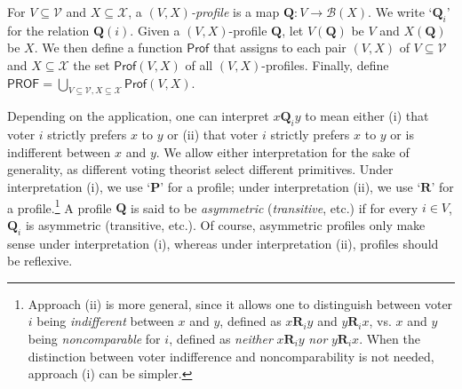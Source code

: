 \documentclass[runningheads]{llncs}
\begin{document}
\begin{definition}\label{ProfileDef} \textnormal{For $V\subseteq\mathcal{V}$ and $X\subseteq\mathcal{X}$, a \emph{$(V,X)$-profile} is a map $\mathbf{Q}:V\to \mathcal{B}(X)$. We write `$\mathbf{Q}_i$' for the relation $\mathbf{Q}(i)$. Given a $(V,X)$-profile $\mathbf{Q}$, let $V(\mathbf{Q})$ be $V$ and $X(\mathbf{Q})$  be $X$. We then define a function $\mathsf{Prof}$ that assigns to each pair $(V,X)$ of $V\subseteq\mathcal{V}$ and $X\subseteq\mathcal{X}$ the set $\mathsf{Prof}(V,X)$ of all $(V,X)$-profiles. Finally, define $\mathsf{PROF} = \bigcup_{V\subseteq\mathcal{V},X\subseteq\mathcal{X}}\mathsf{Prof}(V,X)$.}\end{definition}

Depending on the application, one can interpret $x\mathbf{Q}_i y$ to mean either (i) that voter $i$ strictly prefers $x$ to $y$ or (ii) that voter $i$ strictly prefers $x$ to $y$ or is indifferent between $x$ and $y$. We allow either interpretation for the sake of generality, as different voting theorist select different primitives. Under interpretation (i), we use `$\mathbf{P}$' for a profile; under interpretation (ii), we use `$\mathbf{R}$' for a profile.\footnote{\label{VoterNote}Approach (ii) is more general, since it allows one to distinguish between voter $i$ being \textit{indifferent} between $x$ and $y$, defined as $x\mathbf{R}_iy$ and $y\mathbf{R}_ix$, vs. $x$ and $y$ being \textit{noncomparable} for $i$, defined as \textit{neither} $x\mathbf{R}_iy$ \textit{nor} $y\mathbf{R}_ix$. When the distinction between voter indifference and noncomparability is not needed, approach (i) can be simpler.} A profile $\mathbf{Q}$ is said to be \emph{asymmetric} (\emph{transitive}, etc.) if for every $i\in V$, $\mathbf{Q}_i$ is asymmetric (transitive, etc.). Of course, asymmetric profiles only make sense under interpretation (i), whereas under interpretation (ii), profiles should be reflexive.
\end{document}
